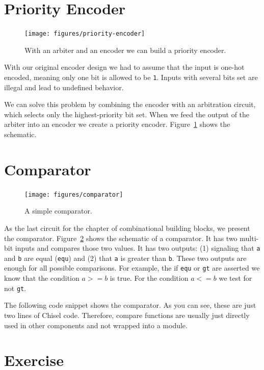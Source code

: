 \documentclass[%
    10pt,
    headinclude, footexclude,
    openright, %
    notitlepage,
    cleardoubleempty,
    headsepline,
    pointlessnumbers,
    bibtotoc, idxtotoc,
    ]{scrbook}
\newcommand{\code}[1]{{\lstinline[basicstyle=\small\ttfamily]{#1}}}
\begin{document}
\section{Priority Encoder}


\begin{figure}
  \centering
  \texttt{[image: figures/priority-encoder]}
  \caption{With an arbiter and an encoder we can build a priority encoder.}
  \label{fig:priority-encoder}
\end{figure}

With our original encoder design we had to assume that the input is one-hot
encoded, meaning only one bit is allowed to be \code{1}. Inputs with several
bits set are illegal and lead to undefined behavior.

We can solve this problem by combining the encoder with an arbitration circuit, which selects only
the highest-priority bit set. When we feed the output of the arbiter into an encoder
we create a priority encoder.
Figure~\ref{fig:priority-encoder} shows the schematic.


\section{Comparator}

\begin{figure}
  \centering
  \texttt{[image: figures/comparator]}
  \caption{A simple comparator.}
  \label{fig:comparator}
\end{figure}

As the last circuit for the chapter of combinational building blocks, we present the comparator.
Figure~\ref{fig:comparator} shows the schematic of a comparator. It has two multi-bit inputs and
compares those two values. It has two outputs: (1) signaling that \code{a} and \code{b} are equal (\code{equ})
and (2) that \code{a} is greater than \code{b}. These two outputs are enough for all possible
comparisons. For example, the if \code{equ} or \code{gt} are asserted we know that the condition
$a >= b$ is true. For the condition $a <= b$ we test for not \code{gt}.

The following code snippet shows the comparator. As you can see, these are just two lines of
Chisel code. Therefore, compare functions are usually just directly used in other components and
not wrapped into a module.


\section{Exercise}
\end{document}
